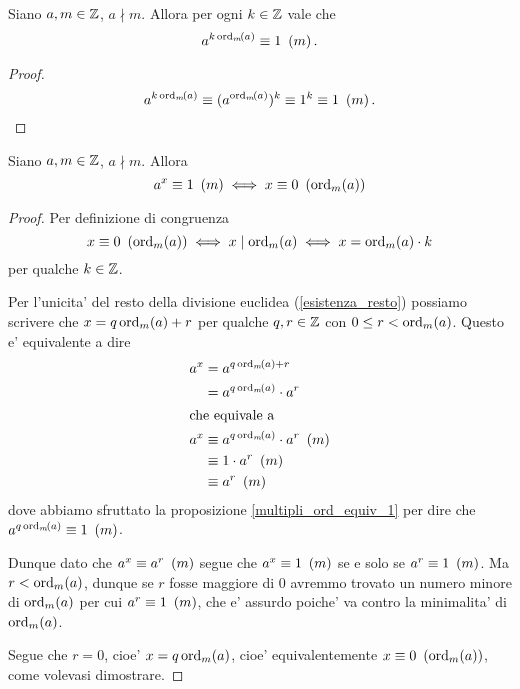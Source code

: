\begin{proposition}\label{multipli_ord_equiv_1}
    Siano $a, m \in \Z$, $a \nmid m$. Allora per ogni $k \in \Z$ vale che \begin{equation}
        a^{k\ord{a}{m}} \equiv 1 \Mod{m}.
    \end{equation}
\end{proposition}
\begin{proof}
    \[
        a^{k\ord{a}{m}} \equiv (a^{\ord{a}{m}})^k \equiv 1^k \equiv 1 \Mod{m}. \qedhere
    \]
\end{proof}

\begin{proposition}\label{solo_multipli_ord_equiv_1}
    Siano $a, m \in \Z$, $a \nmid m$. Allora \begin{equation}
        a^x \equiv 1 \Mod{m} \iff x \equiv 0 \Mod{\ord{a}{m}}
    \end{equation}
\end{proposition}
\begin{proof}
    Per definizione di congruenza 
    \[x \equiv 0 \Mod{\ord{a}{m}} \iff x \mid \ord{a}{m} \iff x = \ord{a}{m}\cdot k\] 
    per qualche $k \in \Z$.

    Per l'unicita' del resto della divisione euclidea (\ref{esistenza_resto}) possiamo scrivere che $x = q\ord{a}{m} + r$ per qualche $q, r \in \Z$ con $0 \leq r < \ord{a}{m}$. Questo e' equivalente a dire \begin{alignat*}
        {1}
        &\begin{alignedat}
            {1}
            a^x &= a^{q\ord{a}{m} + r}\\
            &= a^{q\ord{a}{m}}\cdot a^r
        \end{alignedat} \\
        \intertext{che equivale a}
        &\begin{alignedat}
            {1}
            a^x &\equiv a^{q\ord{a}{m}}\cdot a^r \Mod{m} \\
            &\equiv 1 \cdot a^r \Mod{m}\\
            &\equiv a^r \Mod{m}
        \end{alignedat}
    \end{alignat*}
    dove abbiamo sfruttato la proposizione \ref{multipli_ord_equiv_1} per dire che $a^{q\ord{a}{m}}\equiv 1 \Mod{m}$.

    Dunque dato che $a^x \equiv a^r \Mod{m}$ segue che $a^x \equiv 1 \Mod{m}$ se e solo se $a^r \equiv 1 \Mod{m}$. Ma $r < \ord{a}{m}$, dunque se $r$ fosse maggiore di $0$ avremmo trovato un numero minore di $\ord{a}{m}$ per cui $a^r \equiv 1 \Mod{m}$, che e' assurdo poiche' va contro la minimalita' di $\ord{a}{m}$.

    Segue che $r = 0$, cioe' $x = q\ord{a}{m}$, cioe' equivalentemente $x \equiv 0 \Mod{\ord{a}{m}}$, come volevasi dimostrare.
\end{proof}

